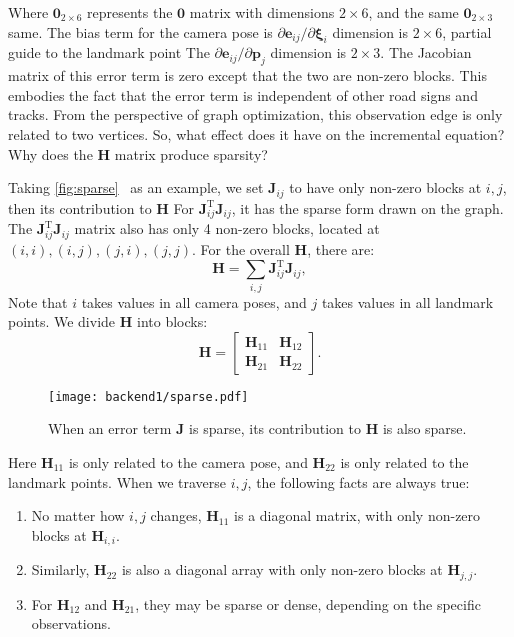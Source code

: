 Where $\bm{0}_{2 \times 6}$ represents the $\bm{0}$ matrix with dimensions $2 \times 6$, and the same $\bm{0}_{2 \times 3}$ same. The bias term for the camera pose is ${\partial \bm{e}_{ij}}/{\partial \bm{\xi}_i}$ dimension is $2 \times 6$, partial guide to the landmark point The ${\partial \bm{e}_{ij}}/{\partial \bm{p}_j}$ dimension is $2 \times 3$. The Jacobian matrix of this error term is zero except that the two are non-zero blocks. This embodies the fact that the error term is independent of other road signs and tracks. From the perspective of graph optimization, this observation edge is only related to two vertices. So, what effect does it have on the incremental equation? Why does the $\bm{H}$ matrix produce sparsity?

Taking \autoref{fig:sparse}~ as an example, we set $\bm{J}_{ij}$ to have only non-zero blocks at $i,j$, then its contribution to $\bm{H}$ For $\bm{J}_{ij}^\mathrm{T} \bm{J}_{ij}$, it has the sparse form drawn on the graph. The $\bm{J}_{ij}^\mathrm{T} \bm{J}_{ij}$ matrix also has only 4 non-zero blocks, located at $(i,i), (i,j) , (j,i), (j,j)$. For the overall $\bm{H}$, there are:
\begin{equation}
\bm{H} = \sum_{i,j} \bm{J}_{ij}^\mathrm{T} \bm{J}_{ij},
\end{equation}
Note that $i$ takes values ​​in all camera poses, and $j$ takes values ​​in all landmark points. We divide $\bm{H}$ into blocks:
\begin{equation}
\label{eq:H-blocks}
\bm{H} = \left[ {\begin{array}{*{20}{c}}
	{{\bm{H}_{11}}}&{{\bm{H}_{12}}}\\
	{{\bm{H}_{21}}}&{{\bm{H}_{22}}}
	\end{array}} \right] .
\end{equation}

\begin{figure}[!htp]
\centering
\texttt{[image: backend1/sparse.pdf]}
\caption{When an error term $\bm{J}$ is sparse, its contribution to $\bm{H}$ is also sparse. }
\label{fig:sparse}
\end{figure}

Here $\bm{H}_{11}$ is only related to the camera pose, and $\bm{H}_{22}$ is only related to the landmark points. When we traverse $i,j$, the following facts are always true:
\begin{enumerate}
\item No matter how $i, j$ changes, $\bm{H}_{11}$ is a diagonal matrix, with only non-zero blocks at $\bm{H}_{i,i}$.
\item Similarly, $\bm{H}_{22}$ is also a diagonal array with only non-zero blocks at $\bm{H}_{j,j}$.
\item For $\bm{H}_{12}$ and $\bm{H}_{21}$, they may be sparse or dense, depending on the specific observations.
\end{enumerate}

